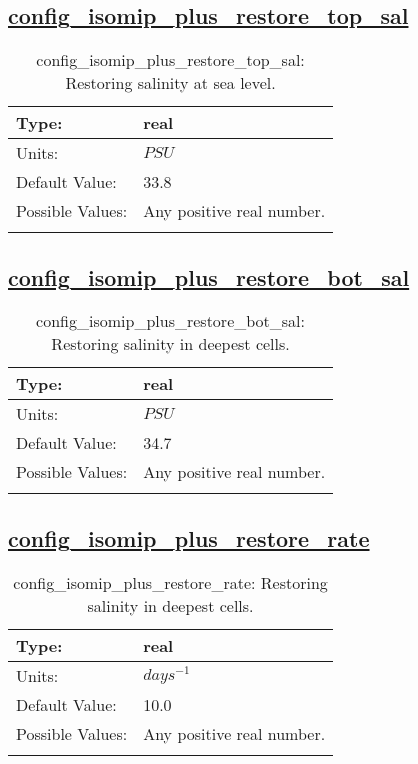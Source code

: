 \subsection[config\_isomip\_plus\_restore\_top\_sal]{\hyperref[sec:nm_tab_isomip_plus]{config\_isomip\_plus\_restore\_top\_sal}}
\label{subsec:nm_sec_config_isomip_plus_restore_top_sal}
\begin{center}
\begin{longtable}{| p{2.0in} || p{4.0in} |}
    \hline
    Type: & real \\
    \hline
    Units: & $PSU$ \\
    \hline
    Default Value: & 33.8 \\
    \hline
    Possible Values: & Any positive real number. \\
    \hline
    \caption{config\_isomip\_plus\_restore\_top\_sal: Restoring salinity at sea level.}
\end{longtable}
\end{center}
\subsection[config\_isomip\_plus\_restore\_bot\_sal]{\hyperref[sec:nm_tab_isomip_plus]{config\_isomip\_plus\_restore\_bot\_sal}}
\label{subsec:nm_sec_config_isomip_plus_restore_bot_sal}
\begin{center}
\begin{longtable}{| p{2.0in} || p{4.0in} |}
    \hline
    Type: & real \\
    \hline
    Units: & $PSU$ \\
    \hline
    Default Value: & 34.7 \\
    \hline
    Possible Values: & Any positive real number. \\
    \hline
    \caption{config\_isomip\_plus\_restore\_bot\_sal: Restoring salinity in deepest cells.}
\end{longtable}
\end{center}
\subsection[config\_isomip\_plus\_restore\_rate]{\hyperref[sec:nm_tab_isomip_plus]{config\_isomip\_plus\_restore\_rate}}
\label{subsec:nm_sec_config_isomip_plus_restore_rate}
\begin{center}
\begin{longtable}{| p{2.0in} || p{4.0in} |}
    \hline
    Type: & real \\
    \hline
    Units: & $days^{-1}$ \\
    \hline
    Default Value: & 10.0 \\
    \hline
    Possible Values: & Any positive real number. \\
    \hline
    \caption{config\_isomip\_plus\_restore\_rate: Restoring salinity in deepest cells.}
\end{longtable}
\end{center}
